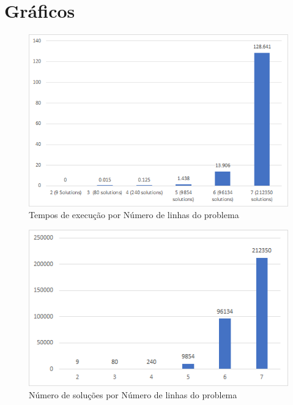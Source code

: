 \appendix
\section{Gráficos}

\begin{figure}
    \centering
    \includegraphics[scale=0.9]{sizes.png}
    \caption{Tempos de execução por Número de linhas do problema}
    \label{fig: sizegraph}
\end{figure}

\begin{figure}
    \centering
    \includegraphics[scale=1.1]{solutions.png}
    \caption{Número de soluções por Número de linhas do problema}
    \label{fig: sizeresultsgraph}
\end{figure}

